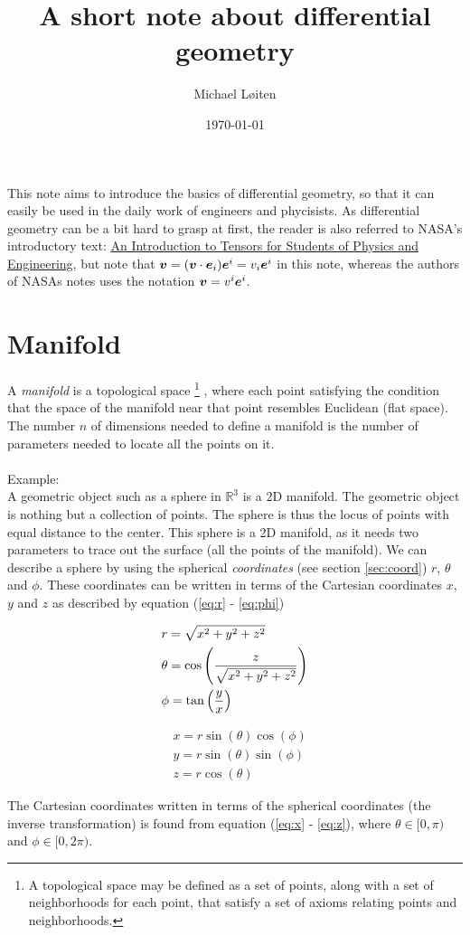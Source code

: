 \documentclass[a4paper, 12pt]{article}
\title{\vspace{-8ex}A short note about differential geometry\vspace{-1ex}}
\author{Michael L{\o}iten}
\date{\vspace{-2ex}\today}
\def\NASAintro{http://www.grc.nasa.gov/WWW/k-12/Numbers/Math/documents/Tensors_TM2002211716.pdf}
\begin{document}
\maketitle

This note aims to introduce the basics of differential geometry, so that it can
easily be used in the daily work of engineers and phycisists. As differential
geometry can be a bit hard to grasp at first, the reader is also referred to
NASA's introductory text:
\href{\NASAintro
}{An Introduction to Tensors for Students of Physics and Engineering}, but note 
that $\boldsymbol{v}=(\boldsymbol{v}\cdot\boldsymbol{e}_i)\boldsymbol{e}^i = v_i\boldsymbol{e}^i$ in this note, whereas 
the authors of NASAs notes uses the notation $\boldsymbol{v}=v^i\boldsymbol{e}^i$.


\section{Manifold}
A \emph{manifold} is a topological space%
\footnote{A topological space may be defined as a set of points, along with a
          set of neighborhoods for each point, that satisfy a set of axioms
          relating points and neighborhoods.}%
, where each point satisfying the condition that the space of the manifold near
that point resembles Euclidean (flat space). The number $n$ of dimensions needed
to define a manifold is the number of parameters needed to locate all the points
on it.\\
\\
Example:\\
A geometric object such as a sphere in $\mathbb{R}^3$ is a 2D manifold. The
geometric object is nothing but a collection of points. The sphere is thus the
locus of points with equal distance to the center. This sphere is a 2D
manifold, as it needs two parameters to trace out the surface (all the points of
the manifold). We can describe a sphere by using the spherical
\emph{coordinates} (see section \ref{sec:coord}) $r$, $\theta$ and $\phi$. These
coordinates can be written in terms of the Cartesian coordinates $x$, $y$ and
$z$ as described by equation (\ref{eq:r} - \ref{eq:phi})

\begin{minipage}{0.49\textwidth}
 \begin{align}
 &r = \sqrt{x^2+y^2+z^2} \label{eq:r}\\
 &\theta = \cos\left(\frac{z}{\sqrt{x^2+y^2+z^2}}\right) \label{eq:theta}\\
 &\phi = \tan\left(\frac{y}{x}\right) \label{eq:phi}
 \end{align}
\end{minipage}
\begin{minipage}{0.49\textwidth}
 \begin{align}
 &x = r\sin(\theta)\cos(\phi) \label{eq:x}\\
 &y = r\sin(\theta)\sin(\phi) \label{eq:y}\\
 &z = r\cos(\theta) \label{eq:z}
 \end{align}
\end{minipage}
%
The Cartesian coordinates written in terms of the spherical coordinates (the
inverse transformation) is found from equation (\ref{eq:x} - \ref{eq:z}),
where $\theta \in [0,\pi)$ and $\phi \in [0,2\pi)$.
\end{document}
